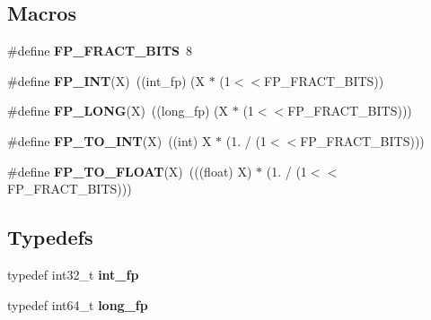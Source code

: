 \subsection*{Macros}
\begin{DoxyCompactItemize}
\item 
\#define {\bfseries F\+P\+\_\+\+F\+R\+A\+C\+T\+\_\+\+B\+I\+TS}~8\hypertarget{gcl-fixedpoint_8h_acea1385611e03f002632ed59445727a6}{}\label{gcl-fixedpoint_8h_acea1385611e03f002632ed59445727a6}

\item 
\#define {\bfseries F\+P\+\_\+\+I\+NT}(X)~((int\+\_\+fp) (X $\ast$ (1$<$$<$F\+P\+\_\+\+F\+R\+A\+C\+T\+\_\+\+B\+I\+TS))\hypertarget{gcl-fixedpoint_8h_a130dd28a7462e0fe048250f2fc98dbb2}{}\label{gcl-fixedpoint_8h_a130dd28a7462e0fe048250f2fc98dbb2}

\item 
\#define {\bfseries F\+P\+\_\+\+L\+O\+NG}(X)~((long\+\_\+fp) (X $\ast$ (1$<$$<$F\+P\+\_\+\+F\+R\+A\+C\+T\+\_\+\+B\+I\+TS)))\hypertarget{gcl-fixedpoint_8h_a7c02c1148dd417013a6ba4bd157ddb07}{}\label{gcl-fixedpoint_8h_a7c02c1148dd417013a6ba4bd157ddb07}

\item 
\#define {\bfseries F\+P\+\_\+\+T\+O\+\_\+\+I\+NT}(X)~((int) X $\ast$ (1. / (1$<$$<$F\+P\+\_\+\+F\+R\+A\+C\+T\+\_\+\+B\+I\+TS)))\hypertarget{gcl-fixedpoint_8h_a9bcd91757487d88d69433aa7bcc01c70}{}\label{gcl-fixedpoint_8h_a9bcd91757487d88d69433aa7bcc01c70}

\item 
\#define {\bfseries F\+P\+\_\+\+T\+O\+\_\+\+F\+L\+O\+AT}(X)~(((float) X) $\ast$ (1. / (1$<$$<$F\+P\+\_\+\+F\+R\+A\+C\+T\+\_\+\+B\+I\+TS)))\hypertarget{gcl-fixedpoint_8h_a292fe0f9de86226446693772ae356f91}{}\label{gcl-fixedpoint_8h_a292fe0f9de86226446693772ae356f91}

\end{DoxyCompactItemize}
\subsection*{Typedefs}
\begin{DoxyCompactItemize}
\item 
typedef int32\+\_\+t {\bfseries int\+\_\+fp}\hypertarget{gcl-fixedpoint_8h_aa1a10f568b12a36dbfe95583fbbbe35a}{}\label{gcl-fixedpoint_8h_aa1a10f568b12a36dbfe95583fbbbe35a}

\item 
typedef int64\+\_\+t {\bfseries long\+\_\+fp}\hypertarget{gcl-fixedpoint_8h_abd8cbe1f4521c00730f7a9931b198281}{}\label{gcl-fixedpoint_8h_abd8cbe1f4521c00730f7a9931b198281}

\end{DoxyCompactItemize}
